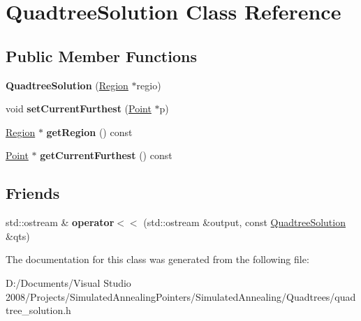 \hypertarget{class_quadtree_solution}{
\section{QuadtreeSolution Class Reference}
\label{class_quadtree_solution}
}
\subsection*{Public Member Functions}
\begin{DoxyCompactItemize}
\item 
\hypertarget{class_quadtree_solution_acaa54865b94769bd242a9faf2cc85ef8}{
{\bfseries QuadtreeSolution} (\hyperlink{class_region}{Region} $\ast$regio)}
\label{class_quadtree_solution_acaa54865b94769bd242a9faf2cc85ef8}

\item 
\hypertarget{class_quadtree_solution_a035062a9609f4c956bb3cb128c2ce6f5}{
void {\bfseries setCurrentFurthest} (\hyperlink{class_point}{Point} $\ast$p)}
\label{class_quadtree_solution_a035062a9609f4c956bb3cb128c2ce6f5}

\item 
\hypertarget{class_quadtree_solution_a31ac479e97e55210f679028e79c0bde7}{
\hyperlink{class_region}{Region} $\ast$ {\bfseries getRegion} () const }
\label{class_quadtree_solution_a31ac479e97e55210f679028e79c0bde7}

\item 
\hypertarget{class_quadtree_solution_a9d13c20d149f30685313fa074e5034ca}{
\hyperlink{class_point}{Point} $\ast$ {\bfseries getCurrentFurthest} () const }
\label{class_quadtree_solution_a9d13c20d149f30685313fa074e5034ca}

\end{DoxyCompactItemize}
\subsection*{Friends}
\begin{DoxyCompactItemize}
\item 
\hypertarget{class_quadtree_solution_a363fe21830bd484028f690f9826c744c}{
std::ostream \& {\bfseries operator$<$$<$} (std::ostream \&output, const \hyperlink{class_quadtree_solution}{QuadtreeSolution} \&qts)}
\label{class_quadtree_solution_a363fe21830bd484028f690f9826c744c}

\end{DoxyCompactItemize}


The documentation for this class was generated from the following file:\begin{DoxyCompactItemize}
\item 
D:/Documents/Visual Studio 2008/Projects/SimulatedAnnealingPointers/SimulatedAnnealing/Quadtrees/quadtree\_\-solution.h\end{DoxyCompactItemize}

